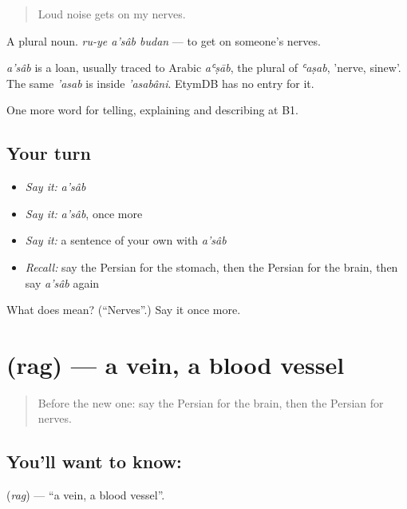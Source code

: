 \begin{quote}
Loud noise gets on my nerves.
\end{quote}

A plural noun. \emph{ru-ye a'sâb budan} — to get on someone's nerves.

\begin{cousinweb}
\emph{a'sâb} is a loan, usually traced to Arabic \emph{aʿṣāb}, the plural of \emph{ʿaṣab}, 'nerve, sinew'. The same \emph{'asab} is inside \emph{'asabâni}. EtymDB has no entry for it.
\end{cousinweb}

\begin{grammarlens}[title={What you've built}]
One more word for telling, explaining and describing at B1.
\end{grammarlens}

\subsection*{Your turn}
\begin{itemize}
\raggedright
  \item \emph{Say it:} \emph{a'sâb}
  \item \emph{Say it:} \emph{a'sâb}, once more
  \item \emph{Say it:} a sentence of your own with \emph{a'sâb}
  \item \emph{Recall:} say the Persian for the stomach, then the Persian for the brain, then say \emph{a'sâb} again
\end{itemize}

\begin{tcolorbox}[breakable,colback=teal!4,colframe=teal!35!black,title={Before you move on}]
What does  mean? (\textquotedblleft{}Nerves\textquotedblright{}.) Say it once more.
\end{tcolorbox}
\section[\texorpdfstring{\fa{رگ} (rag)}{رگ (rag)}]{ (rag) — a vein, a blood vessel}

\label{lesson:FA-C496-rag}



\begin{quote}
Before the new one: say the Persian for the brain, then the Persian for nerves.
\end{quote}

\subsection*{You'll want to know: }
\textbf{} (\emph{rag}) — \textquotedblleft{}a vein, a blood vessel\textquotedblright{}.

